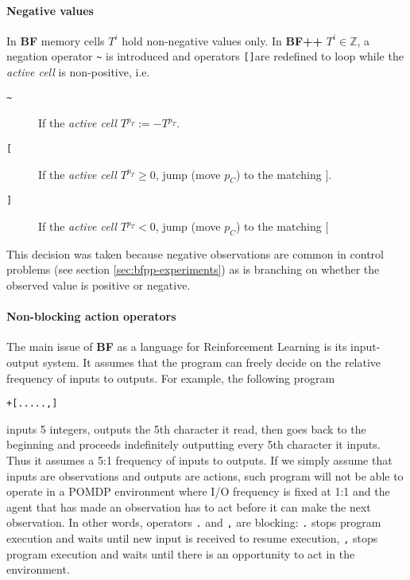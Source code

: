 
\paragraph{Negative values}

In \textbf{BF} memory cells $T^i$ hold non-negative values only.
In \textbf{BF++} $T^i \in \mathbb{Z}$, a negation operator \texttt{\~} is introduced and operators \texttt{[]}are redefined to loop while the \textit{active cell} is non-positive, i.e.

\begin{description}
\item[ \texttt{\~} ] If the \textit{active cell} $T^{p_T} := - T^{p_T}$.
\item[ \texttt{[} ] If the \textit{active cell} $T^{p_T} \geq 0$, jump (move $p_C$) to the matching $]$.
\item[ \texttt{]} ] If the \textit{active cell} $T^{p_T} < 0$, jump (move $p_C$) to the matching $[$
\end{description}

This decision was taken because negative observations are common in control problems (see section \ref{sec:bfpp-experiments}) as is branching on whether the observed value is positive or negative. 

\paragraph{Non-blocking action operators}
\label{sec:queue}


The main issue of \textbf{BF} as a language for Reinforcement Learning is its input-output system.
It assumes that the program can freely decide on the relative frequency of inputs to outputs.
For example, the following program

\begin{center}
\begin{lstlisting}
+[.....,]
\end{lstlisting}
\end{center}

inputs 5 integers, outputs the 5th character it read, then goes back to the beginning and proceeds indefinitely outputting every 5th character it inputs.
Thus it assumes a 5:1 frequency of inputs to outputs.
If we simply assume that inputs are observations and outputs are actions, such program will not be able to operate in a POMDP environment where I/O frequency is fixed at 1:1 and the agent that has made an observation has to act before it can make the next observation.
In other words, operators \texttt{.} and \texttt{,} are blocking: \texttt{.} stops program execution and waits until new input is received to resume execution, \texttt{,} stops program execution and waits until there is an opportunity to act in the environment.

